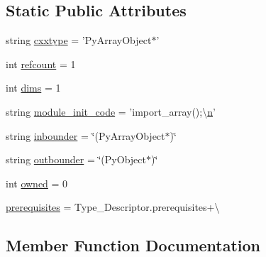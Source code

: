\subsection*{Static Public Attributes}
\begin{DoxyCompactItemize}
\item 
string \hyperlink{classscipy_1_1weave_1_1accelerate__tools_1_1Vector_a8c67f907b6105edddcc7f8b31a427b6e}{cxxtype} = 'Py\+Array\+Object$\ast$'
\item 
int \hyperlink{classscipy_1_1weave_1_1accelerate__tools_1_1Vector_a77102eb70a152214bd4301d94e069d2f}{refcount} = 1
\item 
int \hyperlink{classscipy_1_1weave_1_1accelerate__tools_1_1Vector_a8d7280a40134a997b397c65c190a92ed}{dims} = 1
\item 
string \hyperlink{classscipy_1_1weave_1_1accelerate__tools_1_1Vector_a04693d7ba9497f592d8c04d2c7e1e491}{module\+\_\+init\+\_\+code} = 'import\+\_\+array();\textbackslash{}\hyperlink{indexexpr_8h_ab427e2e2b4d6cec55fa088ea2a692ace}{n}'
\item 
string \hyperlink{classscipy_1_1weave_1_1accelerate__tools_1_1Vector_aec3c1eefe6620b2d65ea80dd372ceeb7}{inbounder} = \char`\"{}(Py\+Array\+Object$\ast$)\char`\"{}
\item 
string \hyperlink{classscipy_1_1weave_1_1accelerate__tools_1_1Vector_a4a58cb0e8eccaac994319ae8bf6fb3d5}{outbounder} = \char`\"{}(Py\+Object$\ast$)\char`\"{}
\item 
int \hyperlink{classscipy_1_1weave_1_1accelerate__tools_1_1Vector_a097233e917013321ff56bc9b9433b74b}{owned} = 0
\item 
\hyperlink{classscipy_1_1weave_1_1accelerate__tools_1_1Vector_a6fcedee06407a0438743d8a54e40bc78}{prerequisites} = Type\+\_\+\+Descriptor.\+prerequisites+\textbackslash{}
\end{DoxyCompactItemize}


\subsection{Member Function Documentation}
\hypertarget{classscipy_1_1weave_1_1accelerate__tools_1_1Vector_ada2a78b6ea5d4e2d3ae79f5937684745}{}
